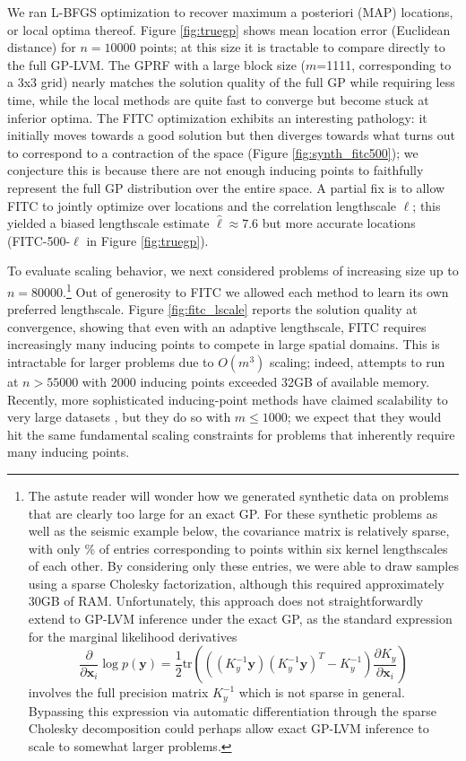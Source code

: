 \documentclass{article}
\newcommand{\tr}{\text{tr}}
\renewcommand{\v}[1]{\mathbf{#1}}
\begin{document}
We ran L-BFGS optimization to recover maximum a posteriori (MAP)
locations, or local optima thereof. Figure \ref{fig:truegp} shows
mean location error (Euclidean distance) for $n=10000$ points; at this
size it is tractable to compare directly to the full GP-LVM. The GPRF
with a large block size ($m$=1111, corresponding to a 3x3 grid) nearly matches the solution
quality of the full GP while requiring less time, while the local
methods are quite fast to converge but become stuck at inferior
optima. The FITC optimization exhibits an interesting pathology: it
initially moves towards a good solution but then diverges towards what
turns out to correspond to
a contraction of the space (Figure \ref{fig:synth_fitc500}); we
conjecture this is because there are not enough inducing points to
faithfully represent the full GP distribution over the entire space. A
partial fix is to allow FITC to jointly optimize over locations and
the correlation lengthscale $\ell$; this yielded a biased lengthscale
estimate $\hat{\ell} \approx 7.6$ but more accurate
locations (FITC-500-$\ell$ in Figure \ref{fig:truegp}).

To evaluate scaling behavior, we next considered problems of
increasing size up to $n=80000.$\footnote{The astute reader will wonder how we generated
  synthetic data on problems that are clearly too large for an exact
  GP. For these synthetic problems as well as the seismic example below, the
  covariance matrix is relatively sparse, with only \% of entries
  corresponding to points within six kernel lengthscales of each other. By considering only these
  entries, we were able to draw samples using a sparse Cholesky
  factorization, although this required approximately 30GB of RAM. Unfortunately, this approach does not straightforwardly
  extend to GP-LVM inference under the exact GP, as the standard
  expression for the marginal likelihood
  derivatives \[\frac{\partial}{\partial \v{x}_{i}} \log p(\v{y})
  = \frac{1}{2} \tr\left( \left((K_y^{-1} \v{y}) (K_y^{-1} \v{y})^T -
      K_y^{-1}\right) \frac{\partial K_y}{\partial \v{x}_{i}} \right)\] involves the full
  precision matrix $K_y^{-1}$ which is not sparse in general. Bypassing this expression via 
  automatic differentiation through the sparse Cholesky
  decomposition could perhaps allow exact GP-LVM inference to scale to
  somewhat larger problems.} Out of generosity to FITC we allowed each method to learn
its own preferred lengthscale. Figure \ref{fig:fitc_lscale}
reports the solution quality at convergence, showing that even with an
adaptive lengthscale, FITC requires increasingly many inducing points
to compete in large spatial domains. This is intractable for larger
problems due to $O(m^3)$ scaling; indeed, attempts to run at $n>55000$
with 2000 inducing points exceeded 32GB of available memory. Recently,
more sophisticated inducing-point methods have claimed scalability to very large
datasets \cite{hensman2013gaussian, gal2014distributed}, but they do
so with $m\le 1000$; we expect that
they would hit the same fundamental scaling constraints for problems
that inherently require many inducing points. 
\end{document}
